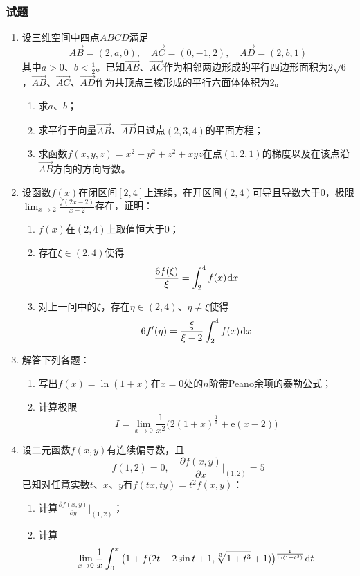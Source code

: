 \documentclass[a4paper,UTF8,fontset=windows,AutoFakeBold]{ctexart}
\newcommand*{\dr}{\hspace{0.07em}\mathrm{d}}
\newcommand*{\er}{\mathrm{e}}
\theoremstyle{ex}
\begin{document}
\subsubsection{试题}
\begin{enumerate}
    \item 设三维空间中四点$ABCD$满足
        $$\overrightarrow{AB}=(2,a,0),\quad\overrightarrow{AC}=(0,-1,2),\quad\overrightarrow{AD}=(2,b,1)$$
        其中$a>0$、$b<\frac{1}{2}$。已知$\overrightarrow{AB}$、$\overrightarrow{AC}$作为相邻两边形成的平行四边形面积为$2\sqrt6$，$\overrightarrow{AB}$、$\overrightarrow{AC}$、$\overrightarrow{AD}$作为共顶点三棱形成的平行六面体体积为2。
    \begin{enumerate}
        \item 求$a$、$b$；
        \item 求平行于向量$\overrightarrow{AB}$、$\overrightarrow{AD}$且过点$(2,3,4)$的平面方程；
        \item 求函数$f(x,y,z)=x^2+y^2+z^2+xyz$在点$(1,2,1)$的梯度以及在该点沿$\overrightarrow{AB}$方向的方向导数。
    \end{enumerate}
    
    \item 设函数$f(x)$在闭区间$[2,4]$上连续，在开区间$(2,4)$可导且导数大于0，极限$\lim_{x\to2}\frac{f(2x-2)}{x-2}$存在，证明：
    \begin{enumerate}
        \item $f(x)$在$(2,4)$上取值恒大于0；
        \item 存在$\xi\in(2,4)$使得
        $$\frac{6f(\xi)}{\xi}=\int_2^4f(x)\dr x$$
        \item 对上一问中的$\xi$，存在$\eta\in(2,4)$、$\eta\ne\xi$使得
        $$6f'(\eta)=\frac{\xi}{\xi-2}\int_2^4f(x)\dr x$$
    \end{enumerate}

    \item 解答下列各题：
    \begin{enumerate}
        \item 写出$f(x)=\ln(1+x)$在$x=0$处的$n$阶带Peano余项的泰勒公式；
        \item 计算极限
        $$I=\lim_{x\to0}\frac{1}{x^2}\big(2(1+x)^{\frac{1}{x}}+\er(x-2)\big)$$
    \end{enumerate}

    \item 设二元函数$f(x,y)$有连续偏导数，且
    $$f(1,2)=0,\quad\frac{\partial f(x,y)}{\partial x}\bigg|_{(1,2)}=5$$
    已知对任意实数$t$、$x$、$y$有$f(tx,ty)=t^2f(x,y)$：
    \begin{enumerate}
        \item 计算$\frac{\partial f(x,y)}{\partial y}\big|_{(1,2)}$；
        \item 计算
        $$\lim_{x\to0}\frac{1}{x}\int_0^x\big(1+f(2t-2\sin t+1,\sqrt[3]{1+t^3}+1)\big)^{\frac{1}{\ln(1+t^3)}}\dr t$$
    \end{enumerate}


\end{enumerate}
\end{document}
